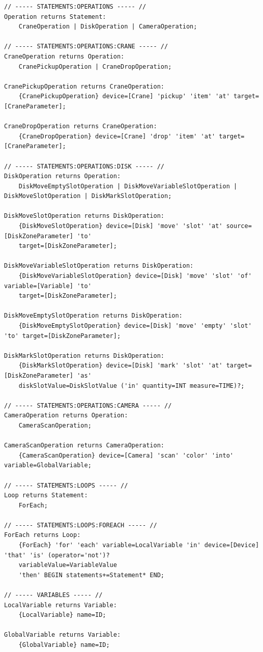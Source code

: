 \begin{verbatim}
// ----- STATEMENTS:OPERATIONS ----- //
Operation returns Statement:
	CraneOperation | DiskOperation | CameraOperation;

// ----- STATEMENTS:OPERATIONS:CRANE ----- //
CraneOperation returns Operation:
	CranePickupOperation | CraneDropOperation;

CranePickupOperation returns CraneOperation:
	{CranePickupOperation} device=[Crane] 'pickup' 'item' 'at' target=[CraneParameter];

CraneDropOperation returns CraneOperation:
	{CraneDropOperation} device=[Crane] 'drop' 'item' 'at' target=[CraneParameter];

// ----- STATEMENTS:OPERATIONS:DISK ----- //
DiskOperation returns Operation:
	DiskMoveEmptySlotOperation | DiskMoveVariableSlotOperation | DiskMoveSlotOperation | DiskMarkSlotOperation;

DiskMoveSlotOperation returns DiskOperation:
	{DiskMoveSlotOperation} device=[Disk] 'move' 'slot' 'at' source=[DiskZoneParameter] 'to'
	target=[DiskZoneParameter];

DiskMoveVariableSlotOperation returns DiskOperation:
	{DiskMoveVariableSlotOperation} device=[Disk] 'move' 'slot' 'of' variable=[Variable] 'to'
	target=[DiskZoneParameter];

DiskMoveEmptySlotOperation returns DiskOperation:
	{DiskMoveEmptySlotOperation} device=[Disk] 'move' 'empty' 'slot' 'to' target=[DiskZoneParameter];

DiskMarkSlotOperation returns DiskOperation:
	{DiskMarkSlotOperation} device=[Disk] 'mark' 'slot' 'at' target=[DiskZoneParameter] 'as'
	diskSlotValue=DiskSlotValue ('in' quantity=INT measure=TIME)?;

// ----- STATEMENTS:OPERATIONS:CAMERA ----- //
CameraOperation returns Operation:
	CameraScanOperation;

CameraScanOperation returns CameraOperation:
	{CameraScanOperation} device=[Camera] 'scan' 'color' 'into' variable=GlobalVariable;

// ----- STATEMENTS:LOOPS ----- //
Loop returns Statement:
	ForEach;

// ----- STATEMENTS:LOOPS:FOREACH ----- //
ForEach returns Loop:
	{ForEach} 'for' 'each' variable=LocalVariable 'in' device=[Device] 'that' 'is' (operator='not')?
	variableValue=VariableValue
	'then' BEGIN statements+=Statement* END;

// ----- VARIABLES ----- //
LocalVariable returns Variable:
	{LocalVariable} name=ID;

GlobalVariable returns Variable:
	{GlobalVariable} name=ID;


\end{verbatim}
